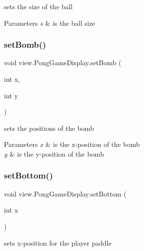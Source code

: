 sets the size of the ball 


\begin{DoxyParams}{Parameters}
{\em s} & is the ball size \\
\hline
\end{DoxyParams}
\hypertarget{classview_1_1_pong_game_display_adb358611d0a270aaf5954141ec8d35c0}{}\label{classview_1_1_pong_game_display_adb358611d0a270aaf5954141ec8d35c0} 
\subsubsection{\texorpdfstring{set\+Bomb()}{setBomb()}}
{\footnotesize\ttfamily void view.\+Pong\+Game\+Display.\+set\+Bomb (\begin{DoxyParamCaption}\item[{int}]{x,  }\item[{int}]{y }\end{DoxyParamCaption})}



sets the positions of the bomb 


\begin{DoxyParams}{Parameters}
{\em x} & is the x-\/position of the bomb \\
\hline
{\em y} & is the y-\/position of the bomb \\
\hline
\end{DoxyParams}
\hypertarget{classview_1_1_pong_game_display_aeaaff1c8033efd2d7f3242ab3b6c7e9e}{}\label{classview_1_1_pong_game_display_aeaaff1c8033efd2d7f3242ab3b6c7e9e} 
\subsubsection{\texorpdfstring{set\+Bottom()}{setBottom()}}
{\footnotesize\ttfamily void view.\+Pong\+Game\+Display.\+set\+Bottom (\begin{DoxyParamCaption}\item[{int}]{x }\end{DoxyParamCaption})}



sets x-\/position for the player paddle 


